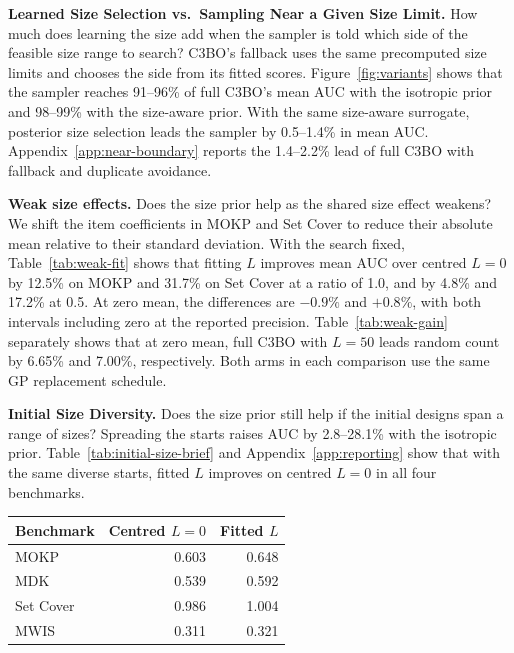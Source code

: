 \documentclass{article}
\newcommand{\revtext}[1]{{\color{blue}#1}}
\theoremstyle{remark}\newtheorem{remark}[proposition]{Remark}
\begin{document}
\revtext{\textbf{Learned Size Selection vs.\ Sampling Near a Given Size Limit.} How much does learning the size add when the sampler is told which side of the feasible size range to search? C3BO's fallback uses the same precomputed size limits and chooses the side from its fitted scores. Figure~\ref{fig:variants} shows that the sampler reaches 91--96\% of full C3BO's mean AUC with the isotropic prior and 98--99\% with the size-aware prior. With the same size-aware surrogate, posterior size selection leads the sampler by 0.5--1.4\% in mean AUC. Appendix~\ref{app:near-boundary} reports the 1.4--2.2\% lead of full C3BO with fallback and duplicate avoidance.}

\revtext{\textbf{Weak size effects.} Does the size prior help as the shared size effect weakens? We shift the item coefficients in MOKP and Set Cover to reduce their absolute mean relative to their standard deviation. With the search fixed, Table~\ref{tab:weak-fit} shows that fitting $L$ improves mean AUC over centred $L=0$ by 12.5\% on MOKP and 31.7\% on Set Cover at a ratio of 1.0, and by 4.8\% and 17.2\% at 0.5. At zero mean, the differences are $-0.9\%$ and $+0.8\%$, with both intervals including zero at the reported precision. Table~\ref{tab:weak-gain} separately shows that at zero mean, full C3BO with $L=50$ leads random count by 6.65\% and 7.00\%, respectively. Both arms in each comparison use the same GP replacement schedule.}

\noindent\begin{minipage}[t]{0.62\linewidth}
\vspace{0pt}
\revtext{\textbf{Initial Size Diversity.} Does the size prior still help if the initial designs span a range of sizes? Spreading the starts raises AUC by 2.8--28.1\% with the isotropic prior. Table~\ref{tab:initial-size-brief} and Appendix~\ref{app:reporting} show that with the same diverse starts, fitted $L$ improves on centred $L=0$ in all four benchmarks.}
\end{minipage}\hfill
\begin{minipage}[t]{0.36\linewidth}
\vspace{0pt}\centering\footnotesize\color{blue}
\setlength{\abovecaptionskip}{0pt}
\setlength{\belowcaptionskip}{3pt}
\label{tab:initial-size-brief}
\setlength{\tabcolsep}{3pt}
\begin{tabular*}{\linewidth}{@{\extracolsep{\fill}}lrr@{}}\toprule
Benchmark & Centred $L=0$ & Fitted $L$ \\
\midrule
MOKP & 0.603 & 0.648 \\
MDK & 0.539 & 0.592 \\
Set Cover & 0.986 & 1.004 \\
MWIS & 0.311 & 0.321 \\
\bottomrule
\end{tabular*}
\end{minipage}\par
\end{document}
